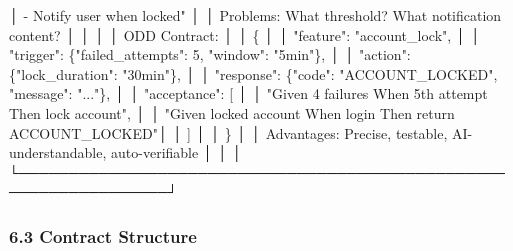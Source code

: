 \documentclass[
]{article}
\newenvironment{Shaded}{}{}
\newcommand{\NormalTok}[1]{#1}
\begin{document}
\begin{Shaded}
\begin{Highlighting}[]
\NormalTok{│   {-} Notify user when locked"                                    │}
\NormalTok{│  Problems: What threshold? What notification content?           │}
\NormalTok{│                                                                  │}
\NormalTok{│  ODD Contract:                                                  │}
\NormalTok{│  \{                                                               │}
\NormalTok{│    "feature": "account\_lock",                                    │}
\NormalTok{│    "trigger": \{"failed\_attempts": 5, "window": "5min"\},          │}
\NormalTok{│    "action": \{"lock\_duration": "30min"\},                         │}
\NormalTok{│    "response": \{"code": "ACCOUNT\_LOCKED", "message": "..."\},     │}
\NormalTok{│    "acceptance": [                                               │}
\NormalTok{│      "Given 4 failures When 5th attempt Then lock account",      │}
\NormalTok{│      "Given locked account When login Then return ACCOUNT\_LOCKED"│}
\NormalTok{│    ]                                                             │}
\NormalTok{│  \}                                                               │}
\NormalTok{│  Advantages: Precise, testable, AI{-}understandable, auto{-}verifiable │}
\NormalTok{│                                                                  │}
\NormalTok{└─────────────────────────────────────────────────────────────────┘}
\end{Highlighting}
\end{Shaded}

\hypertarget{63-contract-structure}{%
\subsubsection{6.3 Contract Structure}\label{63-contract-structure}}
\end{document}
